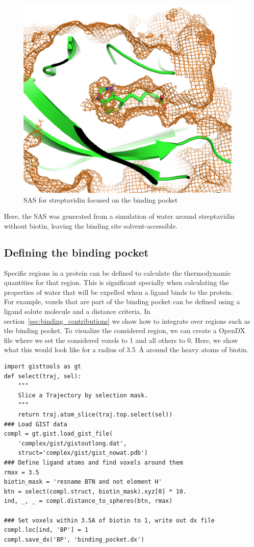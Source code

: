\documentclass[9pt,tutorial]{livecoms}
\begin{document}
\begin{figure}
	\centering
	\includegraphics[width=1\linewidth]{figures/sasa-simple.png}
	\caption{SAS for streptavidin focused on the binding pocket}\label{fig-streptavidin_sasa}
\end{figure}

Here, the SAS was generated from a simulation of water around streptavidin without biotin, leaving the binding site solvent-accessible.
\subsection{Defining the binding pocket}
Specific regions in a protein can be defined to calculate the thermodynamic quantities for that region.
This is significant specially when calculating the properties of water that will be expelled when a ligand binds to the protein.\\
For example, voxels that are part of the binding pocket can be defined using a ligand solute molecule and a distance criteria. 
In section~\ref{sec:binding_contributions} we show how to integrate over regions such as the binding pocket. To visualize the considered region, we can create a OpenDX file where we set the considered voxels to 1 and all others to 0. Here, we show what this would look like for a radius of \SI{3.5}{\angstrom} around the heavy atoms of biotin. 

\begin{lstlisting}[style=python]
import gisttools as gt
def select(traj, sel):
	""" 
	Slice a Trajectory by selection mask. 
	"""
	return traj.atom_slice(traj.top.select(sel))
### Load GIST data
compl = gt.gist.load_gist_file(
	'complex/gist/gistoutlong.dat', 
	struct='complex/gist/gist_nowat.pdb')
### Define ligand atoms and find voxels around them
rmax = 3.5
biotin_mask = 'resname BTN and not element H'
btn = select(compl.struct, biotin_mask).xyz[0] * 10.
ind, _, _ = compl.distance_to_spheres(btn, rmax)

### Set voxels within 3.5A of biotin to 1, write out dx file
compl.loc[ind, 'BP'] = 1
compl.save_dx('BP', 'binding_pocket.dx')
\end{lstlisting}
\end{document}
